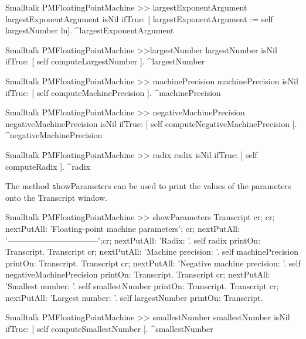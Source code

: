 \begin{displaycode}{Smalltalk}
PMFloatingPointMachine >> largestExponentArgument
    largestExponentArgument isNil
        ifTrue: [ largestExponentArgument := self largestNumber ln].
    ^largestExponentArgument
\end{displaycode}

\begin{displaycode}{Smalltalk}
PMFloatingPointMachine >>largestNumber
    largestNumber isNil
        ifTrue: [ self computeLargestNumber ].
    ^largestNumber
\end{displaycode}

\begin{displaycode}{Smalltalk}
PMFloatingPointMachine >> machinePrecision
    machinePrecision isNil
        ifTrue: [ self computeMachinePrecision ].
    ^machinePrecision
\end{displaycode}

\begin{displaycode}{Smalltalk}
PMFloatingPointMachine >> negativeMachinePrecision
    negativeMachinePrecision isNil
        ifTrue: [ self computeNegativeMachinePrecision ].
    ^negativeMachinePrecision
\end{displaycode}

\begin{displaycode}{Smalltalk}
PMFloatingPointMachine >> radix
    radix isNil
        ifTrue: [ self computeRadix ].
    ^radix
\end{displaycode}

\noindent The method {\texttt showParameters} can be used to print the
values of the parameters onto the Transcript window.

\begin{displaycode}{Smalltalk}
PMFloatingPointMachine >> showParameters
    Transcript cr; cr;
            nextPutAll: 'Floating-point machine parameters'; cr;
            nextPutAll: '---------------------------------';cr;
            nextPutAll: 'Radix: '.
    self radix printOn: Transcript.
    Transcript cr; nextPutAll: 'Machine precision: '.
    self machinePrecision printOn: Transcript.
    Transcript cr; nextPutAll: 'Negative machine precision: '.
    self negativeMachinePrecision printOn: Transcript.
    Transcript cr; nextPutAll: 'Smallest number: '.
    self smallestNumber printOn: Transcript.
    Transcript cr; nextPutAll: 'Largest number: '.
    self largestNumber printOn: Transcript.         
\end{displaycode}

\begin{displaycode}{Smalltalk}
PMFloatingPointMachine >> smallestNumber
    smallestNumber isNil
        ifTrue: [ self computeSmallestNumber ].
    ^smallestNumber
\end{displaycode}

